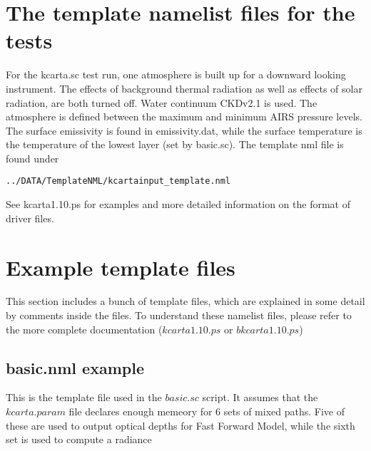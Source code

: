 \documentclass[11pt]{article}
\begin{document}
\section{The template namelist files for the tests}

For the kcarta.sc test run, one atmosphere is built up for a downward
looking instrument. The effects of background thermal radiation as well as
effects of solar radiation, are both turned off. Water continuum CKDv2.1 
is used. The atmosphere is defined between the maximum and minimum AIRS 
pressure levels. The surface emissivity is found in emissivity.dat, while 
the surface temperature is the temperature of the lowest layer (set by 
basic.sc). The template nml file is 
found under\\
\begin{verbatim}
../DATA/TemplateNML/kcartainput_template.nml
\end{verbatim}

See kcarta1.10.ps for examples and more detailed information on the
format of driver files.

\section{Example template files}
This section includes a bunch of template files, which are explained in some
detail by comments inside the files. To understand these namelist files, 
please refer to the more complete documentation ($kcarta1.10.ps$ or 
$bkcarta1.10.ps$)

\subsection{basic.nml example}
This is the template file used in the $basic.sc$ script. It assumes that the
$kcarta.param$ file declares enough memeory for 6 sets of mixed paths. Five
of these are used to output optical depths for Fast Forward Model, while the
sixth set is used to compute a radiance
\end{document}
